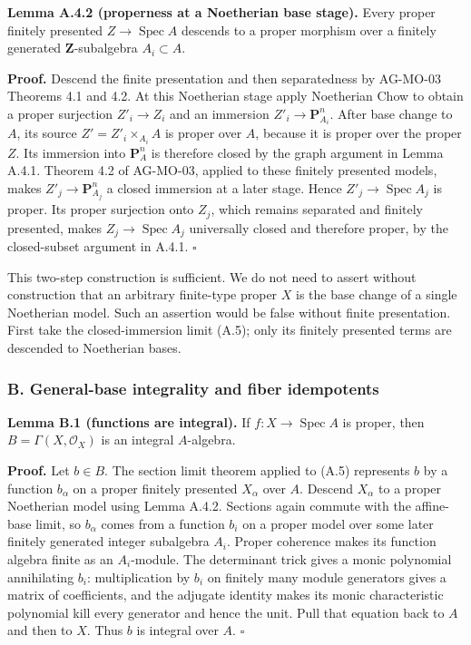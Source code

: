 \documentclass[11pt]{article}
\begin{document}
\textbf{Lemma A.4.2 (properness at a Noetherian base stage).} Every
proper finitely presented \(Z\to\operatorname{Spec}A\) descends to a
proper morphism over a finitely generated \(\mathbf Z\)-subalgebra
\(A_i\subset A\).

\textbf{Proof.} Descend the finite presentation and then separatedness
by AG-MO-03 Theorems 4.1 and 4.2. At this Noetherian stage apply
Noetherian Chow to obtain a proper surjection \(Z'_i\to Z_i\) and an
immersion \(Z'_i\to\mathbf P^n_{A_i}\). After base change to \(A\), its
source \(Z'=Z'_i\times_{A_i}A\) is proper over \(A\), because it is
proper over the proper \(Z\). Its immersion into \(\mathbf P^n_A\) is
therefore closed by the graph argument in Lemma A.4.1. Theorem 4.2 of
AG-MO-03, applied to these finitely presented models, makes
\(Z'_j\to\mathbf P^n_{A_j}\) a closed immersion at a later stage. Hence
\(Z'_j\to\operatorname{Spec}A_j\) is proper. Its proper surjection onto
\(Z_j\), which remains separated and finitely presented, makes
\(Z_j\to\operatorname{Spec}A_j\) universally closed and therefore
proper, by the closed-subset argument in A.4.1. \(\square\)

This two-step construction is sufficient. We do not need to assert
without construction that an arbitrary finite-type proper \(X\) is the
base change of a single Noetherian model. Such an assertion would be
false without finite presentation. First take the closed-immersion limit
(A.5); only its finitely presented terms are descended to Noetherian
bases.

\subsubsection{B. General-base integrality and fiber
idempotents}\label{b.-general-base-integrality-and-fiber-idempotents}

\textbf{Lemma B.1 (functions are integral).} If
\(f:X\to\operatorname{Spec}A\) is proper, then
\(B=\Gamma(X,\mathcal O_X)\) is an integral \(A\)-algebra.

\textbf{Proof.} Let \(b\in B\). The section limit theorem applied to
(A.5) represents \(b\) by a function \(b_\alpha\) on a proper finitely
presented \(X_\alpha\) over \(A\). Descend \(X_\alpha\) to a proper
Noetherian model using Lemma A.4.2. Sections again commute with the
affine-base limit, so \(b_\alpha\) comes from a function \(b_i\) on a
proper model over some later finitely generated integer subalgebra
\(A_i\). Proper coherence makes its function algebra finite as an
\(A_i\)-module. The determinant trick gives a monic polynomial
annihilating \(b_i\): multiplication by \(b_i\) on finitely many module
generators gives a matrix of coefficients, and the adjugate identity
makes its monic characteristic polynomial kill every generator and hence
the unit. Pull that equation back to \(A\) and then to \(X\). Thus \(b\)
is integral over \(A\). \(\square\)
\end{document}
